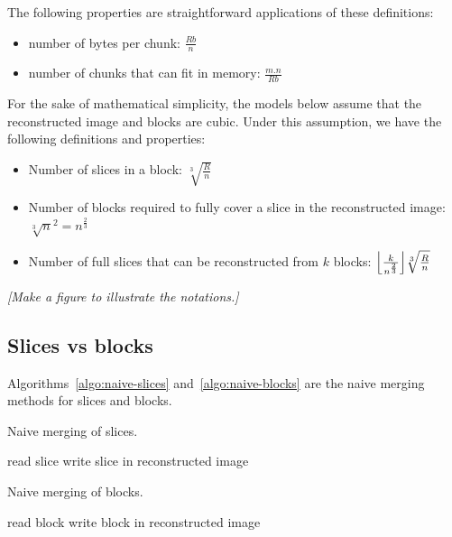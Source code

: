\documentclass[10pt, conference, compsocconf]{IEEEtran}
\DeclarePairedDelimiter{\floor}{\lfloor}{\rfloor}
\newcommand{\todo}[1]{
  \color{red}\emph{[#1]}
  \color{black}
}
\begin{document}
The following properties are straightforward applications of these
definitions:
\begin{itemize}
\item number of bytes per chunk: $\frac{Rb}{n}$
\item number of chunks that can fit in memory: $\frac{m.n}{Rb}$
\end{itemize}
For the sake of mathematical simplicity, the models below assume that
the reconstructed image and blocks are cubic. Under this assumption,
we have the following definitions and properties:
\begin{itemize}
\item Number of slices in a block: $\sqrt[3]{\frac{R}{n}}$
\item Number of blocks required to fully cover a slice in the
  reconstructed image: $\sqrt[3]{n}^2=n^{\frac{2}{3}}$
  \item Number of full slices that can be reconstructed from $k$
    blocks: $\floor*{\frac{k}{n^{\frac{2}{3}}}}\sqrt[3]{\frac{R}{n}}$
\end{itemize}
\todo{Make a figure to illustrate the notations.}

\subsection{Slices vs blocks}

Algorithms~\ref{algo:naive-slices} and~\ref{algo:naive-blocks} are the
naive merging methods for slices and blocks.
\begin{algorithm}[h]
\caption{Naive merging of slices.}
\label{algo:naive-slices} 
\begin{algorithmic}
    \STATE read slice
    \STATE write slice in reconstructed image
  \ENDFOR      
\end{algorithmic}
\end{algorithm}

\begin{algorithm}[h]
\caption{Naive merging of blocks.}
\label{algo:naive-blocks}
\begin{algorithmic}
    \STATE read block
    \STATE write block in reconstructed image
  \ENDFOR 
\end{algorithmic}
\end{algorithm}
\end{document}
